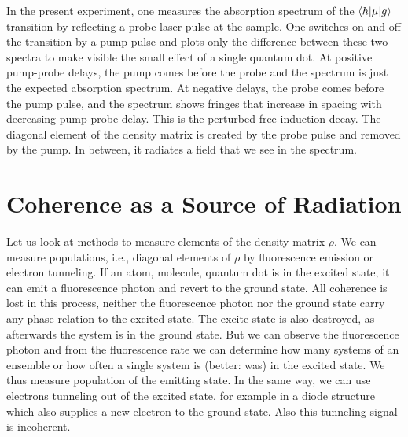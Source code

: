  
In the present experiment, one measures the absorption spectrum of the  $\braket{h | \mu | g}$ transition by reflecting a probe laser pulse at the sample. One switches on and off the transition by a pump pulse and plots only the difference between these two spectra to make visible the small effect of a single quantum dot. At positive pump-probe delays, the pump comes before the probe and the spectrum is just the expected absorption spectrum. At negative delays, the probe comes before the pump pulse, and the spectrum shows fringes that increase in spacing with decreasing pump-probe delay. This is the perturbed free induction decay. The diagonal element of the density matrix is created by the probe pulse and removed by the pump. In between, it radiates a field that we see in the spectrum.

\section{Coherence as a Source of Radiation}


Let us look at methods to measure elements of the density matrix $\rho$. We can measure populations, i.e., diagonal elements of $\rho$ by fluorescence emission or electron tunneling. If an atom, molecule, quantum dot is in the excited state, it can emit a fluorescence photon and revert to the ground state. All coherence is lost in this process, neither the fluorescence photon nor the ground state carry any phase relation to the excited state. The excite state is also destroyed, as afterwards the system is in the ground state. But we can observe the fluorescence photon and from the fluorescence rate we can determine how many systems of an ensemble or how often a single system is (better: was) in the excited state. We thus measure population of the emitting state. In the same way, we can use electrons tunneling out of the excited state, for example in a diode structure which also supplies  a new electron to the ground state. Also this tunneling signal is incoherent.

